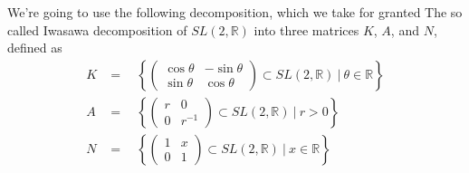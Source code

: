\documentclass[
  12pt
]{article}
\theoremstyle{break}
\theoremstyle{plain}
\begin{document}
  We're going to use the following decomposition, which we take for
  granted 
  The so called Iwasawa decomposition of $SL(2, \mathbb{R})$ into three
  matrices $K$, $A$, and $N$, defined as
  \begin{align}
  K & =\quad \left\{ \begin{pmatrix} \cos\theta & -\sin\theta \\ \sin\theta & \cos\theta\end{pmatrix} \subset SL(2, \mathbb{R})  \ | \ \theta \in \mathbb{R} \right\} \\
  A & =\quad \left\{ \begin{pmatrix} r & 0 \\ 0 & r^{-1} \end{pmatrix} \subset SL(2, \mathbb{R})  \ | \ r > 0 \right\} \\
  N & =\quad \left\{ \begin{pmatrix} 1 & x \\ 0 & 1 \end{pmatrix} \subset SL(2, \mathbb{R})  \ | \ x \in \mathbb{R} \right\}\\
  \end{align}
\end{document}
